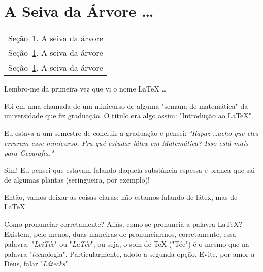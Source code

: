 \section{A Seiva da Árvore \ldots}\label{sec:seiva} %

\begin{margintable}\vspace{.8in}\footnotesize
  \begin{tabularx}{\marginparwidth}{|X}
    Seção~\ref{sec:seiva}. A seiva da árvore\\
    Seção~\ref{sec:seiva}. A seiva da árvore\\
    Seção~\ref{sec:seiva}. A seiva da árvore\\
  \end{tabularx}
\end{margintable}

Lembro-me da primeira vez que vi o nome \LaTeX{} \ldots

Foi em uma chamada de um minicurso de alguma "semana de matemática" da 
universidade que fiz graduação.
O título era algo assim: "Introdução ao \LaTeX".

Eu estava a um semestre de concluir a graduação e pensei: 
\textit{
  "Rapaz \ldots acho que eles erraram esse minicurso. 
  Pra quê estudar látex em Matemática? 
  Isso está mais para Geografia."
}


Sim! 
Eu pensei que estavam falando daquela substância espessa e branca que sai de 
algumas plantas (seringueira, por exemplo)!

Então, vamos deixar as coisas claras: não estamos falando de látex, mas de \LaTeX.

\begin{atencao}{Como pronunciar corretamente?}{\exclamacao}
  Aliás, como se pronuncia a palavra \LaTeX?\\
  Existem, pelo menos, duas maneiras de pronunciarmos, corretamente, essa palavra:
  "\textit{LeiTéc}" ou "\textit{LaTéc}", ou seja, o som de \TeX{} ("Téc") é o 
  mesmo que na palavra "\textit{tec}nologia". 
  Particularmente, adoto a segunda opção.
  Evite, por amor a Deus, falar "\textit{Látecks}".
\end{atencao}

